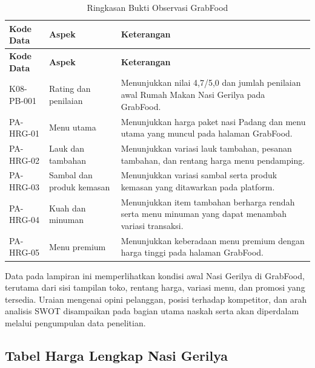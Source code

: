 \begingroup
\footnotesize
\begin{xltabular}{\textwidth}{|Z{2.4cm}|Z{3.2cm}|Y|}
\caption{Ringkasan Bukti Observasi GrabFood}
\label{tab:kode-bukti-prasurvei-grabfood} \\
        \toprule
        \textbf{Kode Data} & \textbf{Aspek} & \textbf{Keterangan} \\ \hline
        \midrule
\endfirsthead
{}
        \toprule
        \textbf{Kode Data} & \textbf{Aspek} & \textbf{Keterangan} \\ \hline
        \midrule
\endhead
{}
\endfoot
        \bottomrule
        \endlastfoot
        K08-PB-001 & Rating dan penilaian & Menunjukkan nilai 4,7/5,0 dan jumlah penilaian awal Rumah Makan Nasi Gerilya pada GrabFood. \\ \hline
        PA-HRG-01 & Menu utama & Menunjukkan harga paket nasi Padang dan menu utama yang muncul pada halaman GrabFood. \\ \hline
        PA-HRG-02 & Lauk dan tambahan & Menunjukkan variasi lauk tambahan, pesanan tambahan, dan rentang harga menu pendamping. \\ \hline
        PA-HRG-03 & Sambal dan produk kemasan & Menunjukkan variasi sambal serta produk kemasan yang ditawarkan pada platform. \\ \hline
        PA-HRG-04 & Kuah dan minuman & Menunjukkan item tambahan berharga rendah serta menu minuman yang dapat menambah variasi transaksi. \\ \hline
        PA-HRG-05 & Menu premium & Menunjukkan keberadaan menu premium dengan harga tinggi pada halaman GrabFood. \\ \hline
        \bottomrule
    
\end{xltabular}
\endgroup

Data pada lampiran ini memperlihatkan kondisi awal Nasi Gerilya di GrabFood, terutama dari sisi tampilan toko, rentang harga, variasi menu, dan promosi yang tersedia. Uraian mengenai opini pelanggan, posisi terhadap kompetitor, dan arah analisis SWOT disampaikan pada bagian utama naskah serta akan diperdalam melalui pengumpulan data penelitian.

\subsection*{Tabel Harga Lengkap Nasi Gerilya}

